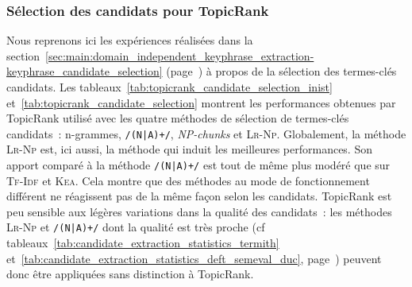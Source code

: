       \subsubsection{Sélection des candidats pour TopicRank}
      \label{subsubsec:main:domain_independent_keyphrase_extraction-unsupervised_automatic_keyphrase_extraction-evaluation-candidate_selection}
        Nous reprenons ici les expériences réalisées dans la
        section~\ref{sec:main:domain_independent_keyphrase_extraction-keyphrase_candidate_selection}
        (page~\pageref{sec:main:domain_independent_keyphrase_extraction-keyphrase_candidate_selection})
        à propos de la sélection des termes-clés candidats. Les
        tableaux~\ref{tab:topicrank_candidate_selection_inist}
        et~\ref{tab:topicrank_candidate_selection} montrent les performances
        obtenues par TopicRank utilisé avec les quatre méthodes de sélection de
        termes-clés candidats~: n-grammes, \texttt{/(N|A)+/}, \textit{NP-chunks}
        et \textsc{Lr-Np}. Globalement, la méthode \textsc{Lr-Np} est, ici
        aussi, la méthode qui induit les meilleures performances. Son apport
        comparé à la méthode \texttt{/(N|A)+/} est tout de même plus modéré que
        sur \textsc{Tf-Idf} et \textsc{Kea}. Cela montre que des méthodes au
        mode de fonctionnement différent ne réagissent pas de la même façon
        selon les candidats. TopicRank est peu sensible aux légères variations dans la
        qualité des candidats~: les méthodes \textsc{Lr-Np} et \texttt{/(N|A)+/}
        dont la qualité est très proche (cf
        tableaux~\ref{tab:candidate_extraction_statistics_termith}
        et~\ref{tab:candidate_extraction_statistics_deft_semeval_duc},
        page~\pageref{tab:candidate_extraction_statistics_termith}) peuvent donc
        être appliquées sans distinction à TopicRank.
